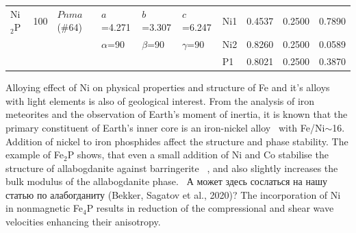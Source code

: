 \documentclass[twoside,twocolumn,9pt]{article}
\begin{document}
\begin{table}[t]
\begin{tabular*}{\textwidth}{@{\extracolsep{\fill}}llllllllll}
\midrule
    Ni$_{2}$P  & 100 & $Pnma$ (\#64) & $a$=4.271   & $b$=3.307   & $c$=6.247    & Ni1 & 0.4537   &  0.2500  &   0.7890  \\
&     &               & $\alpha$=90   & $\beta$=90   & $\gamma$=90   & Ni2 & 0.8260   &  0.2500  &   0.0589  \\   
&     &               &                  &                 &                  & P1 &  0.8021    & 0.2500   &  0.3870  \\
\hline
  \end{tabular*}
\end{table}



Alloying effect of Ni on physical properties and structure of Fe and it's alloys with light elements is also of geological interest. 
{\color{blue}From the analysis of iron meteorites and the observation of Earth's moment of inertia, it is known that the primary constituent of Earth's inner core is an iron-nickel alloy~\cite{Birch-1992} with Fe/Ni$\sim$16.~\cite{ALLEGRE-1995-515,MCDONOUGH-1995-223}}
Addition of nickel to iron phosphides affect the structure and phase stability. 
The example of Fe$_2$P shows, that even a small addition of Ni and Co stabilise the structure of allabogdanite against {\color{blue} barringerite} ~\cite{Britvin-2002, Buseck1969, Nisar-2010-EPSL}, and also slightly increases the  bulk modulus of the allabogdanite phase.~\cite{Nisar-2010-EPSL} 
{\color{red}А может здесь сослаться на нашу статью по алабогданиту (Bekker, Sagatov et al., 2020)?}
The incorporation of Ni in nonmagnetic Fe$_4$P results in reduction of the compressional and shear wave velocities enhancing their anisotropy.\cite{Wu-2011-GRL}
\end{document}
